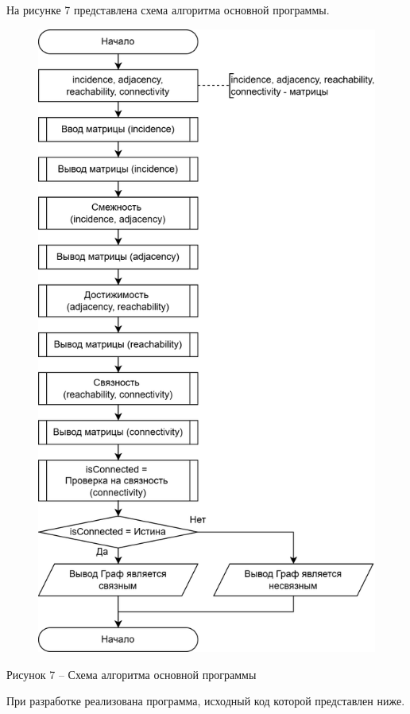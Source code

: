 \documentclass[a4paper,14pt]{extarticle}
\begin{document}
  \pagebreak
  На рисунке 7 представлена схема алгоритма основной программы.

  \begin{figure}[h]
    \centering
    \includegraphics[width=0.63\linewidth]{images/s-6.png}
  \end{figure}
  \begin{center}
    Рисунок 7 – Схема алгоритма основной программы
  \end{center}

  \pagebreak
  При разработке реализована программа, исходный код которой представлен ниже.

  \begingroup
    \linespread{1}
\end{document}
